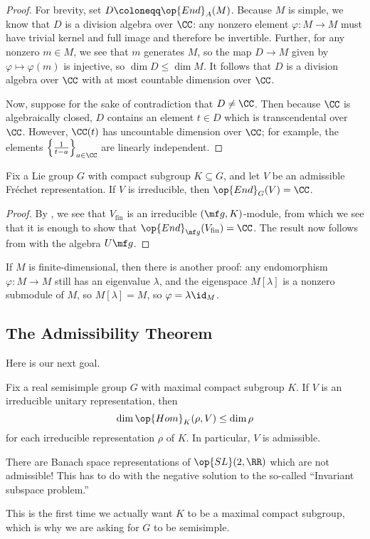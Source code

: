 \documentclass[../notes.tex]{subfiles}
\begin{document}
\begin{proof}
	For brevity, set $D\coloneqq\op{End}_A(M)$. Because $M$ is simple, we know that $D$ is a division algebra over $\CC$: any nonzero element $\varphi\colon M\to M$ must have trivial kernel and full image and therefore be invertible. Further, for any nonzero $m\in M$, we see that $m$ generates $M$, so the map $D\to M$ given by $\varphi\mapsto\varphi(m)$ is injective, so $\dim D\le\dim M$. It follows that $D$ is a division algebra over $\CC$ with at most countable dimension over $\CC$.

	Now, suppose for the sake of contradiction that $D\ne\CC$. Then because $\CC$ is algebraically closed, $D$ contains an element $t\in D$ which is transcendental over $\CC$. However, $\CC(t)$ has uncountable dimension over $\CC$; for example, the elements $\left\{\frac1{t-a}\right\}_{a\in\CC}$ are linearly independent.
\end{proof}
\begin{corollary}
	Fix a Lie group $G$ with compact subgroup $K\subseteq G$, and let $V$ be an admissible Fr\'echet representation. If $V$ is irreducible, then $\op{End}_G(V)=\CC$.
\end{corollary}
\begin{proof}
	By , we see that $V_{\mathrm{fin}}$ is an irreducible $(\mf g,K)$-module, from which we see that it is enough to show that $\op{End}_{\mf g}(V_{\mathrm{fin}})=\CC$. The result now follows from  with the algebra $U\mf g$.
\end{proof}
\begin{remark}
	If $M$ is finite-dimensional, then there is another proof: any endomorphism $\varphi\colon M\to M$ still has an eigenvalue $\lambda$, and the eigenspace $M[\lambda]$ is a nonzero submodule of $M$, so $M[\lambda]=M$, so $\varphi=\lambda\id_M$.
\end{remark}

\subsection{The Admissibility Theorem}
Here is our next goal.
\begin{theorem} \label{thm:hc-admissibility}
	Fix a real semisimple group $G$ with maximal compact subgroup $K$. If $V$ is an irreducible unitary representation, then
	\[\dim\op{Hom}_K(\rho,V)\le\dim\rho\]
	for each irreducible representation $\rho$ of $K$. In particular, $V$ is admissible.
\end{theorem}
\begin{remark}
	There are Banach space representations of $\op{SL}(2,\RR)$ which are not admissible! This has to do with the negative solution to the so-called ``Invariant subspace problem.''
\end{remark}
This is the first time we actually want $K$ to be a maximal compact subgroup, which is why we are asking for $G$ to be semisimple.
\end{document}

